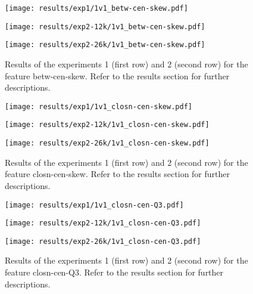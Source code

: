 \begin{figure}[h!]
	\centering
	\begin{minipage}{0.4\linewidth}
		\texttt{[image: results/exp1/1v1\_betw-cen-skew.pdf]}
	\end{minipage}
	
	\begin{minipage}{0.4\linewidth}
		\texttt{[image: results/exp2-12k/1v1\_betw-cen-skew.pdf]}
	\end{minipage}
	\begin{minipage}{0.4\linewidth}
		\texttt{[image: results/exp2-26k/1v1\_betw-cen-skew.pdf]}
	\end{minipage}
	
	\caption[ Results: Feature betw-cen-skew]{ Results of the experiments 1 (first row) and 2 (second row) for the feature betw-cen-skew. Refer to the results section for further descriptions. }
	\label{fig:appendix_betw-cen-skew}
\end{figure}
\newpage 


\begin{figure}[h!]
	\centering
	\begin{minipage}{0.4\linewidth}
		\texttt{[image: results/exp1/1v1\_closn-cen-skew.pdf]}
	\end{minipage}
	
	\begin{minipage}{0.4\linewidth}
		\texttt{[image: results/exp2-12k/1v1\_closn-cen-skew.pdf]}
	\end{minipage}
	\begin{minipage}{0.4\linewidth}
		\texttt{[image: results/exp2-26k/1v1\_closn-cen-skew.pdf]}
	\end{minipage}
	
	\caption[ Results: Feature closn-cen-skew]{ Results of the experiments 1 (first row) and 2 (second row) for the feature closn-cen-skew. Refer to the results section for further descriptions. }
	\label{fig:appendix_closn-cen-skew}
\end{figure}

\begin{figure}[h!]
	\centering
	\begin{minipage}{0.4\linewidth}
		\texttt{[image: results/exp1/1v1\_closn-cen-Q3.pdf]}
	\end{minipage}
	
	\begin{minipage}{0.4\linewidth}
		\texttt{[image: results/exp2-12k/1v1\_closn-cen-Q3.pdf]}
	\end{minipage}
	\begin{minipage}{0.4\linewidth}
		\texttt{[image: results/exp2-26k/1v1\_closn-cen-Q3.pdf]}
	\end{minipage}
	
	\caption[ Results: Feature closn-cen-Q3]{ Results of the experiments 1 (first row) and 2 (second row) for the feature closn-cen-Q3. Refer to the results section for further descriptions. }
	\label{fig:appendix_closn-cen-Q3}
\end{figure}
\newpage 


